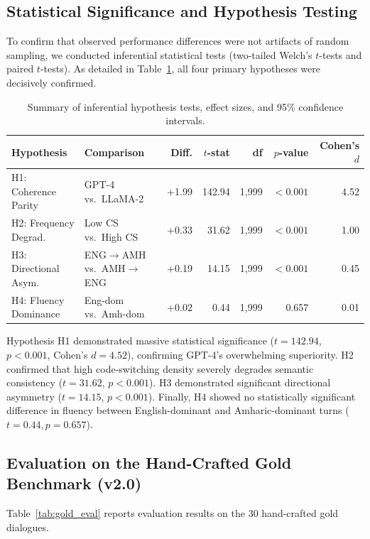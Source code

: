 \documentclass[11pt,a4paper]{article}
\begin{document}
\subsection{Statistical Significance and Hypothesis Testing}
To confirm that observed performance differences were not artifacts of random sampling, we conducted inferential statistical tests (two-tailed Welch's $t$-tests and paired $t$-tests). As detailed in Table~\ref{tab:stat_test}, all four primary hypotheses were decisively confirmed.

\begin{table}[htbp]
\centering
\small
\caption{Summary of inferential hypothesis tests, effect sizes, and 95\% confidence intervals.}
\label{tab:stat_test}
\begin{tabularx}{\textwidth}{lp{2.4cm}rrrrr}
\toprule
\textbf{Hypothesis} & \textbf{Comparison} & \textbf{Diff.} & \textbf{$t$-stat} & \textbf{df} & \textbf{$p$-value} & \textbf{Cohen's $d$} \\
\midrule
H1: Coherence Parity & GPT-4 vs.\ LLaMA-2 & +1.99 & 142.94 & 1,999 & $< 0.001$ & 4.52 \\
H2: Frequency Degrad. & Low CS vs.\ High CS & +0.33 & 31.62 & 1,999 & $< 0.001$ & 1.00 \\
H3: Directional Asym. & ENG$\rightarrow$AMH vs.\ AMH$\rightarrow$ENG & +0.19 & 14.15 & 1,999 & $< 0.001$ & 0.45 \\
H4: Fluency Dominance & Eng-dom vs.\ Amh-dom & +0.02 & 0.44 & 1,999 & 0.657 & 0.01 \\
\bottomrule
\end{tabularx}
\end{table}

Hypothesis H1 demonstrated massive statistical significance ($t = 142.94$, $p < 0.001$, Cohen's $d = 4.52$), confirming GPT-4's overwhelming superiority. H2 confirmed that high code-switching density severely degrades semantic consistency ($t = 31.62$, $p < 0.001$). H3 demonstrated significant directional asymmetry ($t = 14.15$, $p < 0.001$). Finally, H4 showed no statistically significant difference in fluency between English-dominant and Amharic-dominant turns ($t = 0.44, p = 0.657$).

\subsection{Evaluation on the Hand-Crafted Gold Benchmark (v2.0)}
Table~\ref{tab:gold_eval} reports evaluation results on the 30 hand-crafted gold dialogues.
\end{document}
